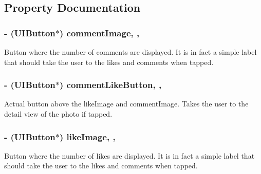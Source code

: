 \subsection{Property Documentation}
\hypertarget{interface_e_s_photo_footer_view_a83d19dc41770a036cd4f501f47bcb1b7}{}
\subsubsection[{comment\+Image}]{\setlength{\rightskip}{0pt plus 5cm}-\/ (U\+I\+Button$\ast$) comment\+Image\hspace{0.3cm}{\ttfamily [read]}, {\ttfamily [nonatomic]}, {\ttfamily [assign]}}\label{interface_e_s_photo_footer_view_a83d19dc41770a036cd4f501f47bcb1b7}
Button where the number of comments are displayed. It is in fact a simple label that should take the user to the likes and comments when tapped. \hypertarget{interface_e_s_photo_footer_view_a7aafde82a43dda000261a50d8b4e5a5d}{}
\subsubsection[{comment\+Like\+Button}]{\setlength{\rightskip}{0pt plus 5cm}-\/ (U\+I\+Button$\ast$) comment\+Like\+Button\hspace{0.3cm}{\ttfamily [read]}, {\ttfamily [nonatomic]}, {\ttfamily [assign]}}\label{interface_e_s_photo_footer_view_a7aafde82a43dda000261a50d8b4e5a5d}
Actual button above the like\+Image and comment\+Image. Takes the user to the detail view of the photo if tapped. \hypertarget{interface_e_s_photo_footer_view_a0b3d99a66a63e279fd4c4bd2ce4e6dbe}{}
\subsubsection[{like\+Image}]{\setlength{\rightskip}{0pt plus 5cm}-\/ (U\+I\+Button$\ast$) like\+Image\hspace{0.3cm}{\ttfamily [read]}, {\ttfamily [nonatomic]}, {\ttfamily [assign]}}\label{interface_e_s_photo_footer_view_a0b3d99a66a63e279fd4c4bd2ce4e6dbe}
Button where the number of likes are displayed. It is in fact a simple label that should take the user to the likes and comments when tapped. \hypertarget{interface_e_s_photo_footer_view_af521914fcde41e29e0c77020a8d3682a}{}

